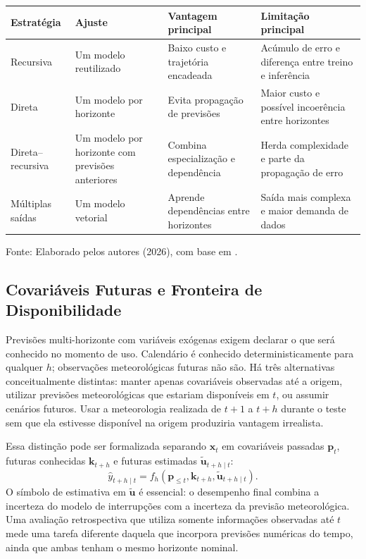 \begin{quadro}[H]
\caption{Comparação entre estratégias de previsão multi-horizonte}
\label{qua:estrategias_multihorizonte}
\centering
\small
\begin{tabular}{p{2.6cm} p{3.5cm} p{3.9cm} p{3.9cm}}
\toprule
\textbf{Estratégia} & \textbf{Ajuste} & \textbf{Vantagem principal} & \textbf{Limitação principal} \\
\midrule
Recursiva & Um modelo reutilizado & Baixo custo e trajetória encadeada & Acúmulo de erro e diferença entre treino e inferência \\
Direta & Um modelo por horizonte & Evita propagação de previsões & Maior custo e possível incoerência entre horizontes \\
Direta--recursiva & Um modelo por horizonte com previsões anteriores & Combina especialização e dependência & Herda complexidade e parte da propagação de erro \\
Múltiplas saídas & Um modelo vetorial & Aprende dependências entre horizontes & Saída mais complexa e maior demanda de dados \\
\bottomrule
\end{tabular}
\normalsize
\par\smallskip
{\small Fonte: Elaborado pelos autores (2026), com base em \cite{taieb2012multistep, lim2021temporal}.\par}
\end{quadro}

\subsection{Covariáveis Futuras e Fronteira de Disponibilidade}

Previsões multi-horizonte com variáveis exógenas exigem declarar o que será conhecido no momento de uso. Calendário é conhecido deterministicamente para qualquer $h$; observações meteorológicas futuras não são. Há três alternativas conceitualmente distintas: manter apenas covariáveis observadas até a origem, utilizar previsões meteorológicas que estariam disponíveis em $t$, ou assumir cenários futuros. Usar a meteorologia realizada de $t+1$ a $t+h$ durante o teste sem que ela estivesse disponível na origem produziria vantagem irrealista.

Essa distinção pode ser formalizada separando $\mathbf{x}_t$ em covariáveis passadas $\mathbf{p}_t$, futuras conhecidas $\mathbf{k}_{t+h}$ e futuras estimadas $\widetilde{\mathbf{u}}_{t+h\mid t}$:
\begin{equation}
    \hat{y}_{t+h\mid t}
    =f_h\left(\mathbf{p}_{\leq t},\mathbf{k}_{t+h},
    \widetilde{\mathbf{u}}_{t+h\mid t}\right).
    \label{eq:covariaveis_futuras}
\end{equation}
O símbolo de estimativa em $\widetilde{\mathbf{u}}$ é essencial: o desempenho final combina a incerteza do modelo de interrupções com a incerteza da previsão meteorológica. Uma avaliação retrospectiva que utiliza somente informações observadas até $t$ mede uma tarefa diferente daquela que incorpora previsões numéricas do tempo, ainda que ambas tenham o mesmo horizonte nominal.

